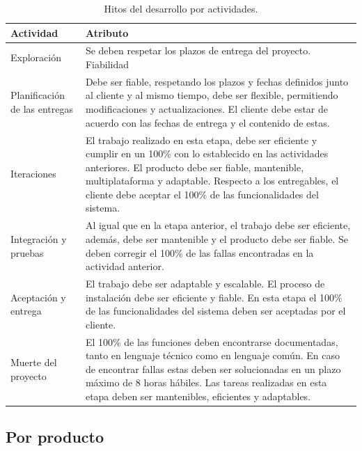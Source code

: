 \begin{table}[H]
    \caption[Hitos del desarrollo por actividades.] {Hitos del desarrollo por actividades.}
    \label{tbl:Objetivos Cuantificales y atributos de calidad por actividades}
    \begin{tabular}{|p{}|p{}|}
        \hline
        \textbf{Actividad} &  \textbf{Atributo}\\
    	\hline
    	\hline
    	Exploración & Se deben respetar los plazos de entrega del proyecto. Fiabilidad \\ \hline
    	Planificación de las entregas & Debe ser fiable, respetando los plazos y fechas definidos junto al cliente y al mismo tiempo, debe ser flexible, permitiendo modificaciones y actualizaciones.
		El cliente debe estar de acuerdo con las fechas de entrega y el contenido de estas. \\ \hline
    	Iteraciones & El trabajo realizado en esta etapa, debe ser eficiente y cumplir en un 100\% con lo establecido en las actividades anteriores. El producto debe ser fiable, mantenible, multiplataforma y adaptable. Respecto a los entregables, el cliente debe aceptar el 100\% de las funcionalidades del sistema. \\ \hline
    	Integración y pruebas & Al igual que en la etapa anterior, el trabajo debe ser eficiente, además, debe ser mantenible y el producto debe ser fiable. Se deben corregir el 100\% de las fallas encontradas en la actividad anterior. \\ \hline
    	Aceptación y entrega & El trabajo debe ser adaptable y escalable. El proceso de instalación debe ser eficiente y fiable. En esta etapa el 100\% de las funcionalidades del sistema deben ser aceptadas por el cliente. \\ \hline
    	Muerte del proyecto & El 100\% de las funciones deben encontrarse documentadas, tanto en lenguaje técnico como en lenguaje común. En caso de encontrar fallas estas deben ser solucionadas en un plazo máximo de 8 horas hábiles. Las tareas realizadas en esta etapa deben ser mantenibles, eficientes y adaptables.  \\ 
        \hline
    \end{tabular}
\end{table}

\subsection{Por producto}

